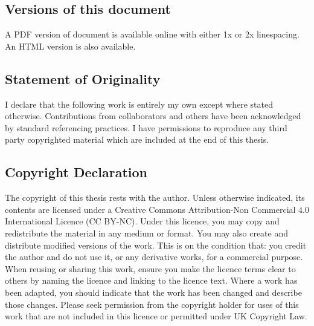 \subsection*{Versions of this document}
A PDF version of document is available online with either 1x or 2x linespacing. An HTML version is also available.


\subsection*{Statement of Originality}
I declare that the following work is entirely my own except where stated otherwise. Contributions from collaborators and others have been acknowledged by standard referencing practices. I have permissions to reproduce any third party copyrighted material which are included at the end of this thesis.

\subsection*{Copyright Declaration}
The copyright of this thesis rests with the author. Unless otherwise indicated, its contents are licensed under a Creative Commons Attribution-Non Commercial 4.0 International Licence (CC BY-NC). Under this licence, you may copy and redistribute the material in any medium or format. You may also create and distribute modified versions of the work. This is on the condition that: you credit the author and do not use it, or any derivative works, for a commercial purpose. When reusing or sharing this work, ensure you make the licence terms clear to others by naming the licence and linking to the licence text. Where a work has been adapted, you should indicate that the work has been changed and describe those changes. Please seek permission from the copyright holder for uses of this work that are not included in this licence or permitted under UK Copyright Law.